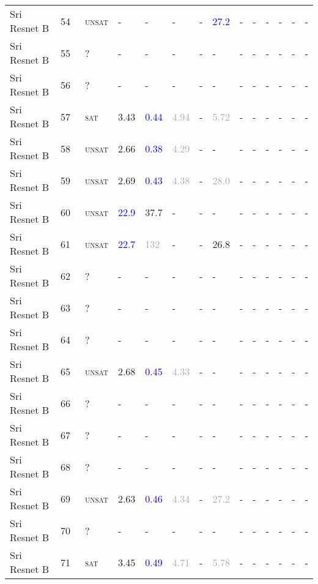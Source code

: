 \begin{center}
{\begin{longtable}{@{}llllllllllllll@{}}
Sri Resnet B & 54 & ~\textsc{unsat} & - & - & - & - & \textcolor{blue}{27.2} & - & - & - & - & - & - \\
Sri Resnet B & 55 & ~? & - & - & - & - & - & - & - & - & - & - & - \\
Sri Resnet B & 56 & ~? & - & - & - & - & - & - & - & - & - & - & - \\
Sri Resnet B & 57 & ~\textsc{sat} & \textcolor{second}{3.43} & \textcolor{blue}{0.44} & \textcolor{darkgray}{4.94} & - & \textcolor{darkgray}{5.72} & - & - & - & - & - & - \\
Sri Resnet B & 58 & ~\textsc{unsat} & \textcolor{second}{2.66} & \textcolor{blue}{0.38} & \textcolor{darkgray}{4.29} & - & - & - & - & - & - & - & - \\
Sri Resnet B & 59 & ~\textsc{unsat} & \textcolor{second}{2.69} & \textcolor{blue}{0.43} & \textcolor{darkgray}{4.38} & - & \textcolor{darkgray}{28.0} & - & - & - & - & - & - \\
Sri Resnet B & 60 & ~\textsc{unsat} & \textcolor{blue}{22.9} & \textcolor{second}{37.7} & - & - & - & - & - & - & - & - & - \\
Sri Resnet B & 61 & ~\textsc{unsat} & \textcolor{blue}{22.7} & \textcolor{darkgray}{132} & - & - & \textcolor{second}{26.8} & - & - & - & - & - & - \\
Sri Resnet B & 62 & ~? & - & - & - & - & - & - & - & - & - & - & - \\
Sri Resnet B & 63 & ~? & - & - & - & - & - & - & - & - & - & - & - \\
Sri Resnet B & 64 & ~? & - & - & - & - & - & - & - & - & - & - & - \\
Sri Resnet B & 65 & ~\textsc{unsat} & \textcolor{second}{2.68} & \textcolor{blue}{0.45} & \textcolor{darkgray}{4.33} & - & - & - & - & - & - & - & - \\
Sri Resnet B & 66 & ~? & - & - & - & - & - & - & - & - & - & - & - \\
Sri Resnet B & 67 & ~? & - & - & - & - & - & - & - & - & - & - & - \\
Sri Resnet B & 68 & ~? & - & - & - & - & - & - & - & - & - & - & - \\
Sri Resnet B & 69 & ~\textsc{unsat} & \textcolor{second}{2.63} & \textcolor{blue}{0.46} & \textcolor{darkgray}{4.34} & - & \textcolor{darkgray}{27.2} & - & - & - & - & - & - \\
Sri Resnet B & 70 & ~? & - & - & - & - & - & - & - & - & - & - & - \\
Sri Resnet B & 71 & ~\textsc{sat} & \textcolor{second}{3.45} & \textcolor{blue}{0.49} & \textcolor{darkgray}{4.71} & - & \textcolor{darkgray}{5.78} & - & - & - & - & - & - \\

\end{longtable}}
\end{center}
